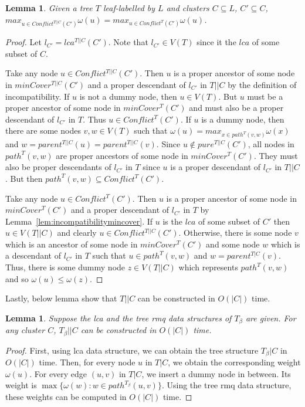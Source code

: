 \documentclass[final,1p,times]{elsarticle}
\newcommand{\weight}{\omega}
\newtheorem{lemma}[theorem]{Lemma}
\begin{document}
    \begin{lemma}
        \label{lem:restrictedweightedmaxincompatible}
        Given a tree $T$ leaf-labelled by $L$ and clusters $C \subseteq L$, $C' \subseteq C$, $max_{u \in Conflict^{T||C}(C')} \weight(u) = max_{u \in Conflict^{T}(C')} \weight(u)$.
    \end{lemma}
        \begin{proof}
            Let $l_{C'} = lca^{T||C}(C')$. Note that $l_{C'} \in V(T)$ since it the $lca$ of some subset of $C$.

            Take any node $u \in Conflict^{T||C}(C')$. Then $u$ is a proper ancestor of some node in $minCover^{T||C}(C')$ and a proper descendant of $l_{C'}$ in $T||C$ by the definition of incompatibility. If $u$ is not a dummy node, then $u \in V(T)$. But $u$ must be a proper ancestor of some node in $minCover^{T}(C')$ and must also be a proper descendant of $l_{C'}$ in $T$. Thus $u \in Conflict^{T}(C')$. If $u$ is a dummy node, then there are some nodes $v, w \in V(T)$ such that $\weight(u) = max_{x \in path^{T}(v, w)} \weight(x)$ and $w = parent^{T||C}(u) = parent^{T||C}(v)$. Since $u \not\in pure^{T||C}(C')$, all nodes in $path^{T}(v, w)$ are proper ancestors of some node in $minCover^{T}(C')$. They must also be proper descendants of $l_{C'}$ in $T$ since $u$ is a proper descendant of $l_{C'}$ in $T||C$. But then $path^{T}(v, w) \subseteq Conflict^{T}(C')$.

            Take any node $u \in Conflict^{T}(C')$. Then $u$ is a proper ancestor of some node in $minCover^{T}(C')$ and a proper descendant of $l_{C'}$ in $T$ by Lemma~\ref{lem:incompatibilitymincover}. If $u$ is the $lca$ of some subset of $C'$ then $u \in V(T||C)$ and clearly $u \in Conflict^{T||C}(C')$. Otherwise, there is some node $v$ which is an ancestor of some node in $minCover^{T}(C')$ and some node $w$ which is a descendant of $l_{C'}$ in $T$ such that $u \in path^{T}(v, w)$ and $w = parent^{T|C}(v)$. Thus, there is some dummy node $z \in V(T||C)$ which represents $path^{T}(v, w)$ and so $\weight(u) \leq \weight(z)$.
        \end{proof}

	Lastly, below lemma show that $T||C$ can be constructed in $O(|C|)$ time.
	\begin{lemma}
		Suppose the lca and the tree rmq data structures of $T_{\beta}$ are given. For any cluster $C$, $T_{\beta}||C$ can be constructed in $O(|C|)$ time.
	\end{lemma}
	\begin{proof}
		First, using lca data structure, we can obtain the tree structure $T_{\beta}|C$ in $O(|C|)$ time. Then, for every node $u$ in $T|C$, we obtain the corresponding weight $\weight(u)$. For every edge $(u, v)$ in $T|C$, we insert a dummy node in between. Its weight is $\max \{ \weight(w) :  w \in path^{T_{\beta}}(u,v) \}$. Using the tree rmq data structure, these weights can be computed in $O(|C|)$ time.
	\end{proof}
\end{document}

